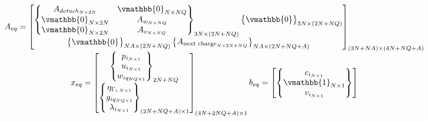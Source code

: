 \documentclass[letterpaper, 10pt, conference]{IEEEtran}
\begin{document}
\begin{equation}
\begin{array}{c}
A_{eq} =
\begin{bmatrix}
    \begin{Bmatrix}
        A_{detach_{N \times 2N}}    & \vmathbb{0}_{N \times NQ} \\
        \vmathbb{0}_{N \times 2N} & A_{w_{N \times NQ}}          \\
        \vmathbb{0}_{N \times 2N} & A_{v_{N \times NQ}}          \\
    \end{Bmatrix}_{3N \times (2N + NQ)}
    \begin{Bmatrix}
        \vmathbb{0}
    \end{Bmatrix}_{3N \times (2N + NQ)} \\
    \begin{Bmatrix}
        \vmathbb{0}_{}
    \end{Bmatrix}_{NA \times (2N + NQ)}
    \begin{Bmatrix}
        A_{\textrm{next charge}_{N \times 2N + NQ}}
    \end{Bmatrix}_{NA \times (2N + NQ + A)} \\
\end{bmatrix}_{(3N + NA) \times (4N + NQ + A)} \\
x_{eq} =
\begin{bmatrix}
    \begin{Bmatrix}
        p_{i_{N \times 1}} \\
        u_{i_{N \times 1}} \\
        w_{iq_{NQ \times 1}} \\
    \end{Bmatrix}_{2N + NQ} \\
    \begin{Bmatrix}
        \eta_{\Gamma_{i\; N \times 1}} \\
        g_{iq_{NQ \times 1}}           \\
        \lambda_{i_{N \times 1}}       \\
    \end{Bmatrix}_{(2N + NQ + A) \times 1}
\end{bmatrix}_{(4N + 2NQ + A) \times 1}
b_{eq} =
\begin{bmatrix}
    \begin{Bmatrix}
        c_{i_{N \times 1}} \\
        \vmathbb{1}_{N \times 1} \\
        v_{i_{N \times 1}} \\

\end{Bmatrix}
\end{bmatrix}
\end{array}
\end{equation}
\end{document}
